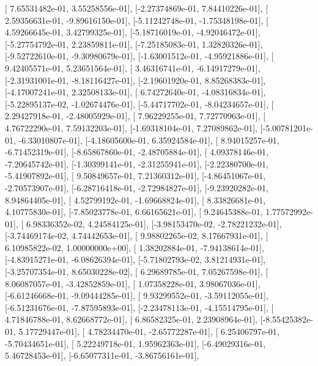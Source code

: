 \documentclass{article}
\begin{document}
       [ 7.65531482e-01,  3.55258556e-01],
       [-2.27374869e-01,  7.84410226e-01],
       [ 2.59356631e-01, -9.89616150e-01],
       [-5.11242748e-01, -1.75348198e-01],
       [ 4.59266645e-01,  3.42799325e-01],
       [-5.18716019e-01, -4.92046472e-01],
       [-5.27754792e-01,  2.23859811e-01],
       [-7.25185083e-01,  1.32820326e-01],
       [-9.52722610e-01, -9.30980679e-01],
       [-1.63001512e-01, -4.95921886e-01],
       [ 9.42405571e-01,  5.23651564e-01],
       [ 3.46316741e-01, -6.14917279e-01],
       [-2.31931001e-01, -8.18116427e-01],
       [-2.19601920e-01,  8.85268383e-01],
       [-4.17007241e-01,  2.32508133e-01],
       [ 6.74272640e-01, -4.08316834e-01],
       [-5.22895137e-02, -1.02674476e-01],
       [-5.44717702e-01, -8.04234657e-01],
       [ 2.29427918e-01, -2.48005929e-01],
       [ 7.96229255e-01,  7.72770963e-01],
       [ 4.76722290e-01,  7.59132203e-01],
       [-1.69318104e-01,  7.27089862e-01],
       [-5.00781201e-01, -6.33010807e-01],
       [-4.18605600e-01,  6.35924584e-01],
       [ 8.94015257e-01, -6.71452319e-01],
       [-8.65867860e-01, -2.48705884e-01],
       [ 4.09378146e-01, -7.20645742e-01],
       [-1.30399141e-01, -2.31255941e-01],
       [-2.22380700e-01, -5.41907892e-01],
       [ 9.50849657e-01,  7.21360312e-01],
       [-4.86451067e-01, -2.70573907e-01],
       [-6.28716418e-01, -2.72984827e-01],
       [-9.23920282e-01,  8.94864405e-01],
       [ 4.52799192e-01, -1.69668824e-01],
       [ 8.33826681e-01,  4.10775830e-01],
       [-7.85023778e-01,  6.66165621e-01],
       [ 9.24645388e-01,  1.77572992e-01],
       [ 6.98336352e-02,  4.24584125e-01],
       [-3.98153470e-02, -2.78221232e-01],
       [-3.74469174e-02,  4.74442653e-01],
       [ 9.98802265e-02,  8.17667931e-01],
       [ 6.10985822e-02,  1.00000000e+00],
       [ 1.38202884e-01, -7.94138614e-01],
       [-4.83915271e-01, -6.08626394e-01],
       [-5.71802793e-02,  3.81214931e-01],
       [-3.25707354e-01,  8.65030228e-02],
       [ 6.29689785e-01,  7.05267598e-01],
       [ 8.06087057e-01, -3.42852859e-01],
       [ 1.07358228e-01,  3.98067036e-01],
       [-6.61246668e-01, -9.09444285e-01],
       [ 9.93299552e-01, -3.59112055e-01],
       [-6.51231676e-01, -7.87595893e-01],
       [-2.23478113e-01, -4.15514795e-01],
       [ 4.71846788e-01,  8.62668772e-01],
       [ 6.86582325e-01,  2.23908964e-01],
       [-8.55425382e-01,  5.17729447e-01],
       [ 4.78234470e-01, -2.65772287e-01],
       [ 6.25406797e-01, -5.70434651e-01],
       [ 5.22249718e-01,  1.95962363e-01],
       [-6.49029316e-01,  5.46728453e-01],
       [-6.65077311e-01, -3.86756161e-01],
\end{document}
